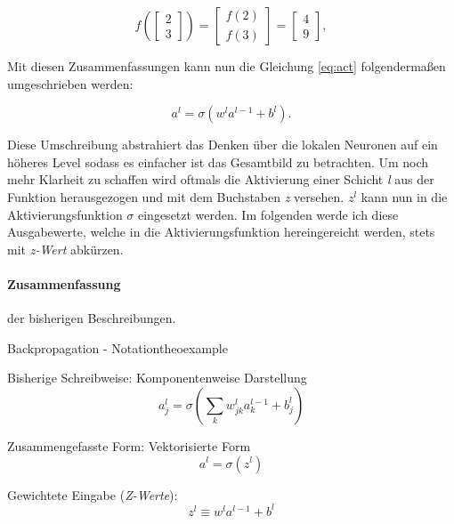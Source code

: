 \begin{equation}
  f\left(\left[ \begin{array}{c} 2 \\ 3 \end{array} \right] \right)
  = \left[ \begin{array}{c} f(2) \\ f(3) \end{array} \right]
  = \left[ \begin{array}{c} 4 \\ 9 \end{array} \right],
\end{equation}

Mit diesen Zusammenfassungen kann nun die Gleichung \ref{eq:act} folgendermaßen umgeschrieben werden: 

\begin{equation}
  a^{l} = \sigma(w^l a^{l-1}+b^l).
\end{equation}

Diese Umschreibung abstrahiert das Denken über die lokalen Neuronen auf ein höheres Level sodass es einfacher ist das Gesamtbild zu betrachten. Um noch mehr Klarheit zu schaffen wird oftmals die Aktivierung einer Schicht \emph{l} aus der Funktion herausgezogen und mit dem Buchstaben \emph{z} versehen. $z^l$ kann nun in die Aktivierungsfunktion $\sigma$ eingesetzt werden. Im folgenden werde ich diese Ausgabewerte, welche in die Aktivierungsfunktion hereingereicht werden, stets mit \emph{z-Wert} abkürzen. 

\paragraph{Zusammenfassung} der bisherigen Beschreibungen.

\begin{mytheo}{Backpropagation - Notation}{theoexample}

Bisherige Schreibweise: Komponentenweise Darstellung
\begin{equation}
  a^{l}_j = \sigma\left( \sum_k w^{l}_{jk} a^{l-1}_k + b^l_j \right) \nonumber
\end{equation}

Zusammengefasste Form: Vektorisierte Form
\begin{equation} \label{eq:zusForm}
a^l = \sigma(z^l)
\end{equation}

Gewichtete Eingabe (\emph{Z-Werte}):
\begin{equation} \label{eq:gewEin}
  z^l \equiv w^l a^{l-1}+b^l
\end{equation}

\end{mytheo}

